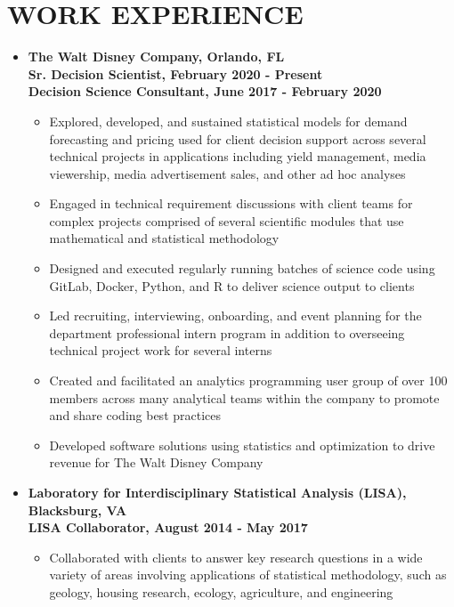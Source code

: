 \documentclass[10pt]{article}
\begin{document}
\section*{WORK EXPERIENCE}
\begin{itemize}
\item[] \textbf{The Walt Disney Company, Orlando, FL\\
Sr. Decision Scientist, February 2020 - Present \\
Decision Science Consultant, June 2017 - February 2020}
\begin{itemize}
\item Explored, developed, and sustained statistical models for demand forecasting and pricing used for client decision support across several technical projects in applications including yield management, media viewership, media advertisement sales, and other ad hoc analyses 
\item Engaged in technical requirement discussions with client teams for complex projects comprised of several scientific modules that use mathematical and statistical methodology
\item Designed and executed regularly running batches of science code using GitLab, Docker, Python, and R to deliver science output to clients
\item Led recruiting, interviewing, onboarding, and event planning for the department professional intern program in addition to overseeing technical project work for several interns
\item Created and facilitated an analytics programming user group of over 100 members across many analytical teams within the company to promote and share coding best practices
\item Developed software solutions using statistics and optimization to drive revenue for The Walt Disney Company
\end{itemize}

\item[] \textbf{Laboratory for Interdisciplinary Statistical Analysis (LISA), Blacksburg, VA\\
LISA Collaborator, August 2014 - May 2017}
\begin{itemize}
\item Collaborated with clients to answer key research questions in a wide variety of areas involving applications of statistical methodology, such as geology, housing research, ecology, agriculture, and engineering
\end{itemize}



\end{itemize}
\end{document}
